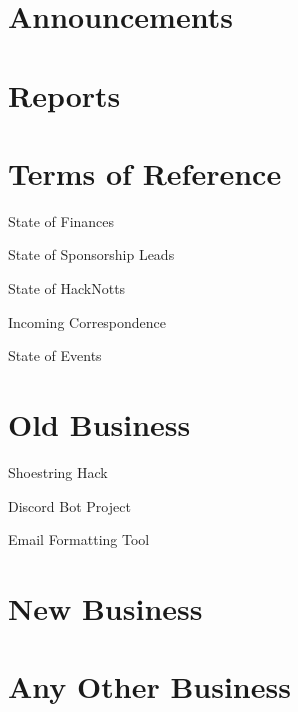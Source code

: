 \documentclass[11pt,hacksoc,agenda]{meetingmins}
\begin{document}
\maketitle

\section{Announcements}
\begin{items}
\item
\end{items}

\section{Reports}

\section{Terms of Reference}
\begin{items}
\item {State of Finances}
\item {State of Sponsorship Leads}
\item {State of HackNotts}
\item {Incoming Correspondence}
\item {State of Events}
\end{items}

\section{Old Business}
\begin{items}
\item Shoestring Hack
\item Discord Bot Project
\item Email Formatting Tool
\end{items}

\section{New Business}


\section{Any Other Business}

\vspace{1em}
\end{document}
